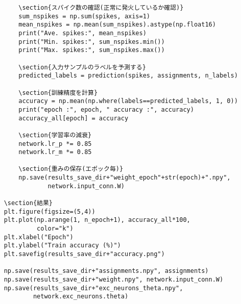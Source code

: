 \begin{verbatim}
        \section{スパイク数の確認(正常に発火しているか確認)}
        sum_nspikes = np.sum(spikes, axis=1)
        mean_nspikes = np.mean(sum_nspikes).astype(np.float16)
        print("Ave. spikes:", mean_nspikes)
        print("Min. spikes:", sum_nspikes.min())
        print("Max. spikes:", sum_nspikes.max())
    
        \section{入力サンプルのラベルを予測する}
        predicted_labels = prediction(spikes, assignments, n_labels)
        
        \section{訓練精度を計算}
        accuracy = np.mean(np.where(labels==predicted_labels, 1, 0))
        print("epoch :", epoch, " accuracy :", accuracy)
        accuracy_all[epoch] = accuracy
        
        \section{学習率の減衰}
        network.lr_p *= 0.85
        network.lr_m *= 0.85
        
        \section{重みの保存(エポック毎)}
        np.save(results_save_dir+"weight_epoch"+str(epoch)+".npy",
                network.input_conn.W)
        
    \section{結果}
    plt.figure(figsize=(5,4))
    plt.plot(np.arange(1, n_epoch+1), accuracy_all*100,
             color="k")
    plt.xlabel("Epoch")
    plt.ylabel("Train accuracy (%)")
    plt.savefig(results_save_dir+"accuracy.png")
    
    np.save(results_save_dir+"assignments.npy", assignments)
    np.save(results_save_dir+"weight.npy", network.input_conn.W)
    np.save(results_save_dir+"exc_neurons_theta.npy",
            network.exc_neurons.theta)
\end{verbatim}
